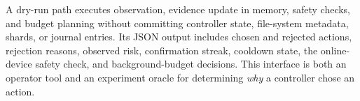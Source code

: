 A dry-run path executes observation, evidence update in memory, safety checks, and budget planning without committing controller state, file-system metadata, shards, or journal entries. Its JSON output includes chosen and rejected actions, rejection reasons, observed risk, confirmation streak, cooldown state, the online-device safety check, and background-budget decisions. This interface is both an operator tool and an experiment oracle for determining \emph{why} a controller chose an action.

